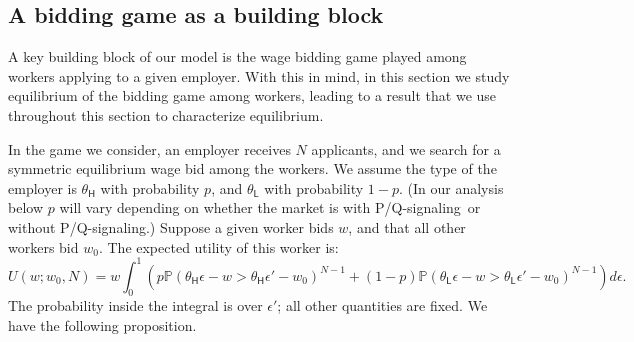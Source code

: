 \documentclass[11pt]{article}
\renewcommand{\H}{\ensuremath{\mathsf{H}}}
\renewcommand{\L}{\ensuremath{\mathsf{L}}}
\newcommand{\E}{\ensuremath{\mathbb{E}}}
\renewcommand{\P}{\ensuremath{\mathbb{P}}}
\newtheorem{lemma}{Lemma}
\newcommand{\hottowel}{P/Q-signaling}
\begin{document}
\subsection{A bidding game as a building block}

A key building block of our model is the wage bidding game played among workers applying to a given employer.
With this in mind, in this section we study equilibrium of the bidding game among workers, leading to a result that we use throughout this section to characterize equilibrium.

In the game we consider, an employer receives $N$ applicants, and we search for a symmetric equilibrium wage bid among the workers.
We assume the type of the employer is $\theta_{\H}$ with probability $p$, and $\theta_{\L}$ with probability $1-p$.
(In our analysis below $p$ will vary depending on whether the market is with \hottowel~or without \hottowel.)
Suppose a given worker bids $w$, and that all other workers bid $w_0$.
The expected utility of this worker is:
\begin{equation}
\label{eq:worker_util}
U(w;w_0,N) = 
 w \int_0^1 \left( p \P(\theta_{\H} \epsilon - w > \theta_{\H} \epsilon' - w_0)^{N-1} + (1-p) \P(\theta_{\L} \epsilon - w > \theta_{\L} \epsilon' - w_0)^{N-1}\right) d\epsilon.
\end{equation}
The probability inside the integral is over $\epsilon'$; all other quantities are fixed.
We have the following proposition.


\end{document}

